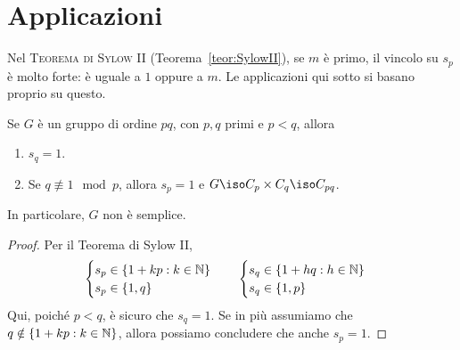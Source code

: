 
\section{Applicazioni}

Nel {\scshape Teorema di Sylow II} (Teorema~\ref{teor:SylowII}), se $m$ è primo, il vincolo su $s_p$ è molto forte: è uguale a $1$ oppure a $m$. Le applicazioni qui sotto si basano proprio su questo.

\begin{prop}\label{prop:GruppiPQ}
Se $G$ è un gruppo di ordine $pq$, con $p, q$ primi e $p < q$, allora
\begin{enumerate}
\item $s_q = 1$.
\item Se $q \not\equiv 1 \mod p$, allora $s_p=1$ e $G\iso C_p\times C_q\iso C_{pq}$.
\end{enumerate}
In particolare, $G$ non è semplice.
\end{prop}

\begin{proof}
Per il Teorema di Sylow II, 
\[
\begin{cases}
s_p \in \{1+kp : k \in \mathbb{N}\} \\ 
s_p \in \{1, q\}
\end{cases}
\quad
\begin{cases}
s_q \in \{1+hq : h \in \mathbb{N}\} \\
s_q \in \{1, p\}
\end{cases}
\]
Qui, poiché $p < q$, è sicuro che $s_q = 1$. Se in più assumiamo che $q \notin \{1 + kp : k \in \mathbb{N}\}$, allora possiamo concludere che anche $s_p = 1$.
\end{proof}




